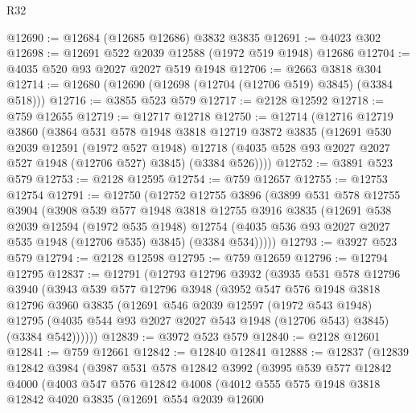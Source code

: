 \begin{lexlean}{R32}
\begin{coremodule}
@12690 := @12684 (@12685 @12686) @3832 @3835
@12691 := @4023 @302
@12698 := @12691 @522 @2039 @12588 (@1972 @519 @1948) @12686
@12704 := @4035 @520 @93 @2027 @2027 @519 @1948
@12706 := @2663 @3818 @304
@12714 := @12680 (@12690 (@12698 (@12704 (@12706 @519) @3845) (@3384 @518)))
@12716 := @3855 @523 @579
@12717 := @2128 @12592
@12718 := @759 @12655
@12719 := @12717 @12718
@12750 := @12714
    (@12716
      @12719
      @3860
      (@3864
        @531
        @578
        @1948
        @3818
        @12719
        @3872
        @3835
        (@12691
          @530
          @2039
          @12591
          (@1972 @527 @1948)
          @12718
          (@4035 @528 @93 @2027 @2027 @527 @1948 (@12706 @527) @3845)
          (@3384 @526))))
@12752 := @3891 @523 @579
@12753 := @2128 @12595
@12754 := @759 @12657
@12755 := @12753 @12754
@12791 := @12750
    (@12752
      @12755
      @3896
      (@3899
        @531
        @578
        @12755
        @3904
        (@3908
          @539
          @577
          @1948
          @3818
          @12755
          @3916
          @3835
          (@12691
            @538
            @2039
            @12594
            (@1972 @535 @1948)
            @12754
            (@4035 @536 @93 @2027 @2027 @535 @1948 (@12706 @535) @3845)
            (@3384 @534)))))
@12793 := @3927 @523 @579
@12794 := @2128 @12598
@12795 := @759 @12659
@12796 := @12794 @12795
@12837 := @12791
    (@12793
      @12796
      @3932
      (@3935
        @531
        @578
        @12796
        @3940
        (@3943
          @539
          @577
          @12796
          @3948
          (@3952
            @547
            @576
            @1948
            @3818
            @12796
            @3960
            @3835
            (@12691
              @546
              @2039
              @12597
              (@1972 @543 @1948)
              @12795
              (@4035 @544 @93 @2027 @2027 @543 @1948 (@12706 @543) @3845)
              (@3384 @542))))))
@12839 := @3972 @523 @579
@12840 := @2128 @12601
@12841 := @759 @12661
@12842 := @12840 @12841
@12888 := @12837
    (@12839
      @12842
      @3984
      (@3987
        @531
        @578
        @12842
        @3992
        (@3995
          @539
          @577
          @12842
          @4000
          (@4003
            @547
            @576
            @12842
            @4008
            (@4012
              @555
              @575
              @1948
              @3818
              @12842
              @4020
              @3835
              (@12691
                @554
                @2039
                @12600

\end{coremodule}
\end{lexlean}
